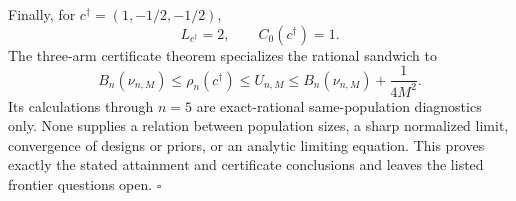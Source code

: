 Finally, for \(c^\dagger=(1,-1/2,-1/2)\),
\[
 L_{c^\dagger}=2,
 \qquad C_0(c^\dagger)=1.
\]
The three-arm certificate theorem specializes the rational sandwich to
\[
 B_n(\nu_{n,M})\leq\rho_n(c^\dagger)\leq U_{n,M}
 \leq B_n(\nu_{n,M})+\frac1{4M^2}.
\]
Its calculations through \(n=5\) are exact-rational same-population diagnostics only. None supplies a relation between population sizes, a sharp normalized limit, convergence of designs or priors, or an analytic limiting equation. This proves exactly the stated attainment and certificate conclusions and leaves the listed frontier questions open. \(\square\)